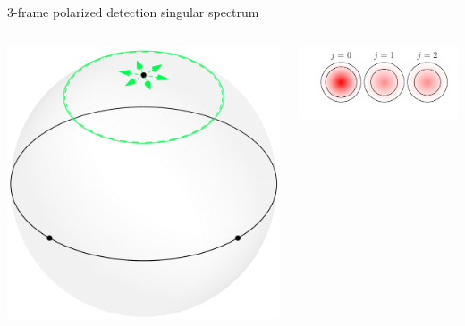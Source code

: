 \documentclass[presentation]{beamer}
\begin{document}
\begin{frame}[label=sec-1]{3-frame polarized detection singular spectrum}
  \begin{columns}
    \begin{column}{0.25\textwidth}
      \centering
      \includegraphics[width=1.0\columnwidth]{pol_detect3/scene.pdf}
    \end{column}
    \begin{column}{0.75\textwidth}
      \centering
      \includegraphics[width=1.0\columnwidth]{pol_detect3/svs.pdf}
    \end{column}
  \end{columns}
\end{frame}

  
\end{document}
